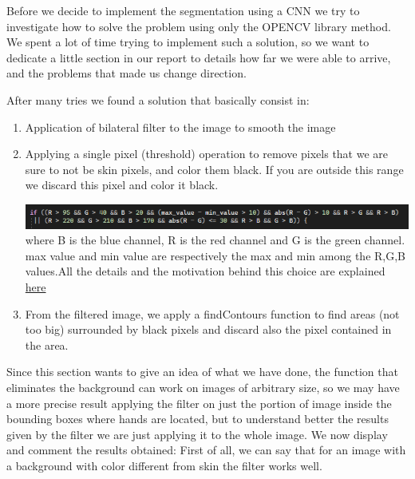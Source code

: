 Before we decide to implement the segmentation using a CNN we try to investigate how to solve the problem using only the OPENCV library method.
We spent a lot of time trying to implement such a solution, so we want to dedicate a little section in our report to details how far we were able to arrive, and the problems that made us change direction.

After many tries we found a solution that basically consist in:
\begin{enumerate}
    \item Application of bilateral filter to the image to smooth the image

    \item Applying a single pixel (threshold) operation to remove pixels that we are sure to not be skin pixels, and color them black. If you are outside this range we discard this pixel and color it black. 
    
    \includegraphics[scale=0.9]{images/unused_seg/code.PNG}
    \newline
    where B is the blue channel, R is the red channel and G is the green channel. max value and min value are respectively the max and min among the R,G,B values.\newline All the details and the motivation behind this choice are explained \href{https://www.researchgate.net/publication/258333832_An_Appropriate_Color_space_to_Improve_Human_Skin_Detection}{here}
    
    \item From the filtered image, we apply a findContours function to find areas (not too big) surrounded by black pixels and discard also the pixel contained in the area.
\end{enumerate}
Since this section wants to give an idea of what we have done, the function that eliminates the background can work on images of arbitrary size, so we may have a more precise result applying the filter on just the portion of image inside the bounding boxes where hands are located, but to understand better the results given by the filter we are just applying it to the whole image.
We now display and comment the results obtained:
First of all, we can say that for an image with a background with color different from skin the filter works well.
